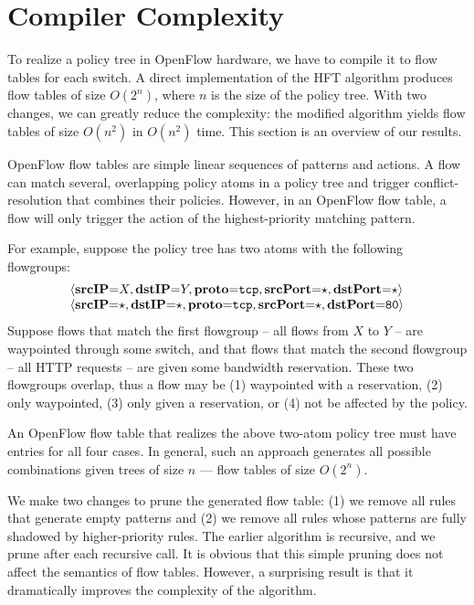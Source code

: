 \section{Compiler Complexity}
\label{sec:compiler-complexity}

To realize a policy tree in OpenFlow hardware, we have to compile it
to flow tables for each switch. A direct
implementation of the HFT algorithm produces flow tables of size
$O(2^n)$, where $n$ is the size of the policy tree.
With two changes, we can greatly reduce the complexity: the modified
algorithm yields flow tables of size $O(n^2)$ in $O(n^2)$ time.
This section is an overview of our results. 

OpenFlow flow tables are simple linear
sequences of patterns and actions. A flow can match several,
overlapping policy atoms in a policy tree and trigger
conflict-resolution that combines their policies. However, in an
OpenFlow flow table, a flow will only trigger the action of the
highest-priority matching pattern.

For example, suppose the policy tree has two atoms with the following
flowgroups:
\[
\begin{array}{l}
\langle\textbf{srcIP}\mathord{=}X,\textbf{dstIP}\mathord{=}Y,\textbf{proto}\mathord{=}\texttt{tcp},\textbf{srcPort}\mathord{=}\star,\textbf{dstPort}\mathord{=}\star\rangle \\
\langle\textbf{srcIP}\mathord{=}\star,\textbf{dstIP}\mathord{=}\star,\textbf{proto}\mathord{=}\texttt{tcp},\textbf{srcPort}\mathord{=}\star,\textbf{dstPort}\mathord{=}\texttt{80}\rangle
\end{array}
\]
Suppose flows that match the first flowgroup -- all flows from $X$ to
$Y$ -- are waypointed through some switch, and that flows that match
the second flowgroup -- all HTTP requests -- are given some bandwidth
reservation.  These two flowgroups overlap, thus a flow may be (1)
waypointed with a reservation, (2) only waypointed, (3) only given a
reservation, or (4) not be affected by the policy.

An OpenFlow flow table that realizes the above two-atom policy tree must have
entries for all four cases. In general, such an approach generates all possible
combinations given trees of size $n$ --- \ie flow tables of size $O(2^n)$.

We make two changes to prune the generated flow table: (1) we remove
all rules that generate empty patterns and (2) we remove all rules
whose patterns are fully shadowed by higher-priority rules. The
earlier algorithm is recursive, and we prune after each recursive
call.  It is obvious that this simple pruning does not affect the
semantics of flow tables. However, a surprising result is that it
dramatically improves the complexity of the algorithm.


